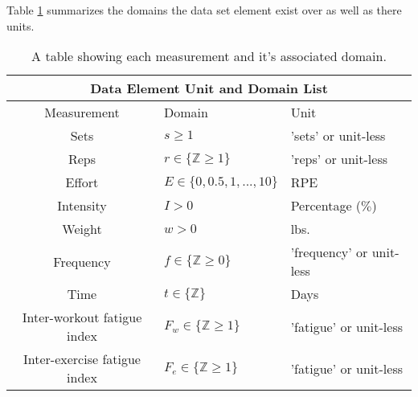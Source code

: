 

Table \ref{tab:DomainUnitTable} summarizes the domains the data set element exist over as well as there units.

\begin{table}[h]
	\centering
    \begin{tabular}{|c|l|l|}
	    \hline
	    \multicolumn{3}{|c|}{Data Element Unit and Domain List} \\
	    \hline
        Measurement & Domain & Unit \\
        \hline
        Sets & $s\ge 1$ & 'sets' or unit-less\\
        Reps & $r\in \{ \mathbb{Z} \ge 1 \}$ & 'reps' or unit-less \\
        Effort & $E\in \{0,0.5,1,...,10\}$ & RPE \\
        Intensity & $I>0$ & Percentage ($\%$) \\
        Weight & $w>0$ & lbs. \\
        Frequency & $f\in \{ \mathbb{Z}\ge 0 \}$ & 'frequency' or unit-less \\
        Time & $t\in \{ \mathbb{Z} \}$ & Days \\
        Inter-workout fatigue index & $F_w\in \{ \mathbb{Z} \ge 1 \}$ & 'fatigue' or unit-less \\
        Inter-exercise fatigue index & $F_e\in \{ \mathbb{Z} \ge 1 \}$ & 'fatigue' or unit-less \\
        \hline
    \end{tabular}
    \caption{A table showing each measurement and it's associated domain.}
    \label{tab:DomainUnitTable}
\end{table}